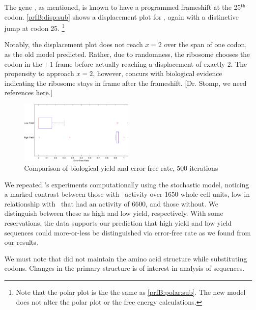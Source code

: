 \documentclass[12pt]{article}
\numberwithin{equation}{section}
\begin{document}
The gene \prfB, as mentioned, is known
to have a programmed frameshift at the 25$^{\textrm{th}}$ codon.
\autoref{prfB:disp:sub} shows a displacement plot for
\prfB, again with a distinctive jump at codon 25.
\footnote{Note that the polar plot is the the same as \autoref{prfB:polar:sub}.
The new model does not alter the polar plot or the free energy calculations.}

Notably, the displacement plot does not reach $x=2$ over the span of
one codon, as the old model predicted.  Rather, due to randomness, the
ribosome chooses the codon in the $+1$ frame before actually reaching
a displacement of exactly 2.  The propensity to approach $x=2$,
however, concurs with biological evidence indicating the ribosome
stays in frame after the frameshift.  [Dr. Stomp, we need references
  here.]

\begin{figure}
  \caption{Comparison of biological yield and error-free rate, 500 iterations}
  \label{weissboxplot}
  \includegraphics[width=0.5\textwidth]{histograms/weissbox}
\end{figure}

We repeated \citeauthor{weiss87}'s experiments computationally
using the stochastic model, noticing a marked contrast between those
with \bgals\ activity over 1650 whole-cell units, low in
relationship with \prfB\ that had an activity of 6600, and those
without. We distinguish between these as high and low yield, respectively.
With some reservations, the data supports our prediction that high yield
and low yield sequences could more-or-less be distinguished via
error-free rate as we found from our results.

We must note that \citeauthor{weiss87} did not maintain the amino acid structure
while substituting codons.  Changes in the primary structure is of interest in
analysis of sequences.
\end{document}
